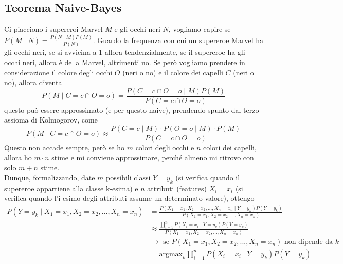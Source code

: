 \documentclass[11pt]{report}
\begin{document}
\subsection{Teorema Naive-Bayes}
Ci piacciono i supereroi Marvel $M$ e gli occhi neri $N$, vogliamo capire se $P(M \mid N) = \frac{P(N \mid M)P(M)}{P(N)}$. Guardo la frequenza con cui un supereroe Marvel ha gli occhi neri, se si avvicina a 1 allora tendenzialmente, se il supereroe ha gli occhi neri, allora è della Marvel, altrimenti no. Se però vogliamo prendere in considerazione il colore degli occhi $O$ (neri o no) e il colore dei capelli $C$ (neri o no), allora diventa
\begin{equation}
    P(M \mid C=c \cap O=o) = \frac{P(C=c \cap O=o \mid M)P(M)}{P(C=c \cap O=o)}
\end{equation}
questo può essere approssimato (e per questo naive), prendendo spunto dal terzo assioma di Kolmogorov, come
\begin{equation}
    P(M \mid C=c \cap O=o) \approx \frac{P(C=c \mid M) \cdot P(O=o \mid M) \cdot P(M)}{P(C=c \cap O=o)}
\end{equation}
Questo non accade sempre, però se ho $m$ colori degli occhi e $n$ colori dei capelli, allora ho $m \cdot n$ stime e mi conviene approssimare, perché almeno mi ritrovo con solo $m + n$ stime.\\
Dunque, formalizzando, date $m$ possibili classi $Y = y_k$ (si verifica quando il supereroe appartiene alla classe k-esima) e $n$ attributi (features) $X_i = x_i$ (si verifica quando l'i-esimo degli attributi assume un determinato valore), ottengo
\begin{equation}
    \begin{split}
        P(Y = y_k \mid X_1 = x_1, X_2 = x_2,..., X_n = x_n) & = \frac{P(X_1 = x_1, X_2 = x_2,..., X_n = x_n \mid Y = y_k)P(Y = y_k)}{P(X_1 = x_1, X_2 = x_2,..., X_n = x_n)}\\
        & \approx \frac{\prod_{i=1}^{n}P(X_i = x_i \mid Y = y_k)P(Y = y_k)}{P(X_1 = x_1, X_2 = x_2,..., X_n = x_n)}\\
        & \rightarrow \text{ se } P(X_1 = x_1, X_2 = x_2,..., X_n = x_n) \text{ non dipende da } k\\
        & = \text{argmax}_k \prod_{i=1}^{n}P(X_i = x_i \mid Y = y_k)P(Y = y_k)
    \end{split}
\end{equation}
\end{document}
